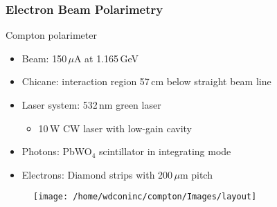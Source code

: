 \begin{frame}
 \frametitle{Electron Beam Polarimetry}
 \begin{block}{Compton polarimeter}
  \begin{itemize}
   \item \alert{Beam}: 150\,$\mu$A at 1.165\,GeV
   \item \alert{Chicane}: interaction region 57\,cm below straight beam line
   \item \alert{Laser system}: 532\,nm green laser
    \begin{itemize}
     \item 10\,W CW laser with low-gain cavity
    \end{itemize}
   \item \alert{Photons}: PbWO$_4$ scintillator in integrating mode
   \item \alert{Electrons}: Diamond strips with 200\,$\mu$m pitch
  \end{itemize}
 \end{block}
 \begin{figure}
  \texttt{[image: /home/wdconinc/compton/Images/layout]}
 \end{figure}
\end{frame}
